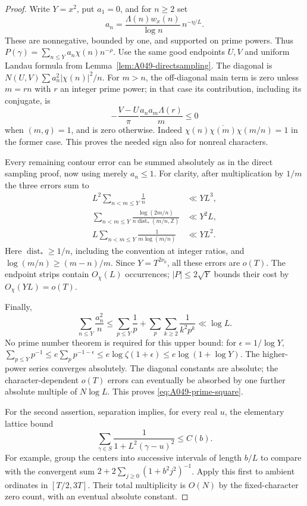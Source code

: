 \begin{proof}
Write \(Y=x^2\), put \(a_1=0\), and for \(n\ge2\) set
\[
 a_n=\frac{\Lambda(n)w_x(n)}{\log n}\,n^{-\eta/L}.
\]
These are nonnegative, bounded by one, and supported on prime
powers. Thus \(P(\gamma)=\sum_{n\le Y}a_n\chi(n)n^{-\rho}\).
Use the same good endpoints \(U,V\) and uniform Landau formula
from Lemma~\ref{lem:A049-directsampling}. The diagonal is
\(N(U,V)\sum a_n^2|\chi(n)|^2/n\). For \(m>n\), the
off-diagonal main term is zero unless \(m=rn\) with \(r\)
an integer prime power; in that case its contribution,
including its conjugate, is
\[
           -\frac{V-U}{\pi}
                   \frac{a_na_m\Lambda(r)}m\le0
\]
when \((m,q)=1\), and is zero otherwise. Indeed
\(\chi(n)\overline{\chi(m)}\chi(m/n)=1\) in the former case.
This proves the needed sign also for nonreal characters.

Every remaining contour error can be summed absolutely as
in the direct sampling proof, now using merely \(a_n\le1\).
For clarity, after multiplication by \(1/m\) the three
errors sum to
\[
 \begin{aligned}
 L^2\sum_{n<m\le Y}\frac1n&\ll YL^3,\\
 \sum_{n<m\le Y}\frac{\log(2m/n)}
                       {n\operatorname{dist}_*(m/n,\mathbb Z)}
                                  &\ll Y^2L,\\
 L\sum_{n<m\le Y}\frac1{m\log(m/n)}&\ll YL^2.
 \end{aligned}
\]
Here \(\operatorname{dist}_*\ge1/n\), including the convention
at integer ratios, and \(\log(m/n)\ge(m-n)/m\).
Since \(Y=T^{2\nu_0}\), all these errors are \(o(T)\).
The endpoint strips contain \(O_\chi(L)\) occurrences;
\(|P|\le2\sqrt Y\) bounds their cost by \(O_\chi(YL)=o(T)\).

Finally,
\[
 \sum_{n\le Y}\frac{a_n^2}n
 \le\sum_{p\le Y}\frac1p+
             \sum_p\sum_{k\ge2}\frac1{k^2p^k}
                                     \ll\log L.
\]
No prime number theorem is required for this upper bound:
for \(\epsilon=1/\log Y\),
\(\sum_{p\le Y}p^{-1}\le e\sum_p p^{-1-\epsilon}
 \le e\log\zeta(1+\epsilon)
 \le e\log(1+\log Y)\).
The higher-power series converges absolutely. The diagonal
constants are absolute; the character-dependent \(o(T)\)
errors can eventually be absorbed by one further absolute
multiple of \(N\log L\). This proves
\eqref{eq:A049-prime-square}.

For the second assertion, separation implies, for every real
\(u\), the elementary lattice bound
\[
              \sum_{\gamma\in S}
                \frac1{1+L^2(\gamma-u)^2}\le C(b).
\]
For example, group the centers into successive intervals of
length \(b/L\) to compare with the convergent sum
\(2+2\sum_{j\ge0}(1+b^2j^2)^{-1}\).
Apply this first to ambient ordinates in \([T/2,3T]\).
Their total multiplicity is \(O(N)\) by the fixed-character
zero count, with an eventual absolute constant.


\end{proof}
